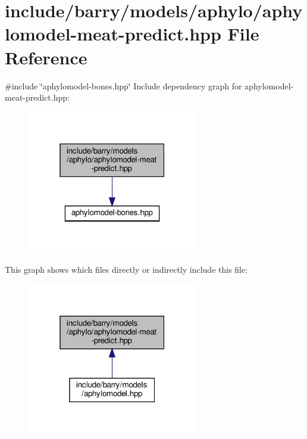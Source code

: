 \hypertarget{aphylomodel-meat-predict_8hpp}{}\section{include/barry/models/aphylo/aphylomodel-\/meat-\/predict.hpp File Reference}
\label{aphylomodel-meat-predict_8hpp}
{\ttfamily \#include \char`\"{}aphylomodel-\/bones.\+hpp\char`\"{}}\newline
Include dependency graph for aphylomodel-\/meat-\/predict.hpp\+:
\nopagebreak
\begin{figure}[H]
\begin{center}
\leavevmode
\includegraphics[width=211pt]{aphylomodel-meat-predict_8hpp__incl}
\end{center}
\end{figure}
This graph shows which files directly or indirectly include this file\+:
\nopagebreak
\begin{figure}[H]
\begin{center}
\leavevmode
\includegraphics[width=211pt]{aphylomodel-meat-predict_8hpp__dep__incl}
\end{center}
\end{figure}
